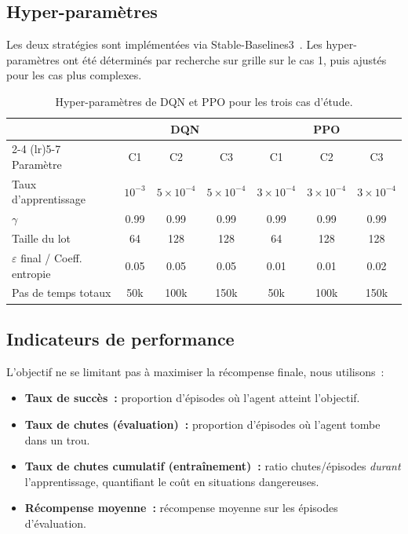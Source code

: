 \documentclass{article}
\begin{document}
\subsection{Hyper-paramètres}

Les deux stratégies sont implémentées via Stable-Baselines3~\cite{raffin2021stable}. Les hyper-paramètres ont été déterminés par recherche sur grille sur le cas 1, puis ajustés pour les cas plus complexes.

\begin{table}[H]
\centering
\caption{Hyper-paramètres de DQN et PPO pour les trois cas d'étude.}
\label{tab:params}
\small
\begin{tabular}{lcccccc}
\toprule
 & \multicolumn{3}{c}{\textbf{DQN}} & \multicolumn{3}{c}{\textbf{PPO}} \\
\cmidrule(lr){2-4} \cmidrule(lr){5-7}
Paramètre & C1 & C2 & C3 & C1 & C2 & C3 \\
\midrule
Taux d'apprentissage & $10^{-3}$ & $5{\times}10^{-4}$ & $5{\times}10^{-4}$ & $3{\times}10^{-4}$ & $3{\times}10^{-4}$ & $3{\times}10^{-4}$ \\
$\gamma$ & 0.99 & 0.99 & 0.99 & 0.99 & 0.99 & 0.99 \\
Taille du lot & 64 & 128 & 128 & 64 & 128 & 128 \\
$\varepsilon$ final / Coeff. entropie & 0.05 & 0.05 & 0.05 & 0.01 & 0.01 & 0.02 \\
Pas de temps totaux & 50k & 100k & 150k & 50k & 100k & 150k \\
\bottomrule
\end{tabular}
\end{table}

\subsection{Indicateurs de performance}

L'objectif ne se limitant pas à maximiser la récompense finale, nous utilisons~:
\begin{itemize}
    \item \textbf{Taux de succès~:} proportion d'épisodes où l'agent atteint l'objectif.
    \item \textbf{Taux de chutes (évaluation)~:} proportion d'épisodes où l'agent tombe dans un trou.
    \item \textbf{Taux de chutes cumulatif (entraînement)~:} ratio chutes/épisodes \textit{durant} l'apprentissage, quantifiant le coût en situations dangereuses.
    \item \textbf{Récompense moyenne~:} récompense moyenne sur les épisodes d'évaluation.
\end{itemize}
\end{document}
